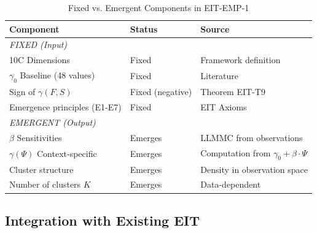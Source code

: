 \begin{table}[htbp]
\centering
\caption{Fixed vs. Emergent Components in EIT-EMP-1}
\label{tab:fixed-vs-emergent}
\renewcommand{\arraystretch}{1.3}
\begin{tabular}{@{}lll@{}}
\toprule
\textbf{Component} & \textbf{Status} & \textbf{Source} \\
\midrule
\multicolumn{3}{l}{\textit{FIXED (Input)}} \\
\midrule
10C Dimensions & Fixed & Framework definition \\
$\gamma_0$ Baseline (48 values) & Fixed & Literature \\
Sign of $\gamma(F,S)$ & Fixed (negative) & Theorem EIT-T9 \\
Emergence principles (E1-E7) & Fixed & EIT Axioms \\
\midrule
\multicolumn{3}{l}{\textit{EMERGENT (Output)}} \\
\midrule
$\beta$ Sensitivities & Emerges & LLMMC from observations \\
$\gamma(\Psi)$ Context-specific & Emerges & Computation from $\gamma_0 + \beta \cdot \Psi$ \\
Cluster structure & Emerges & Density in observation space \\
Number of clusters $K$ & Emerges & Data-dependent \\
\bottomrule
\end{tabular}
\end{table}

\subsection{Integration with Existing EIT}
\label{subsec:emp1-integration}

